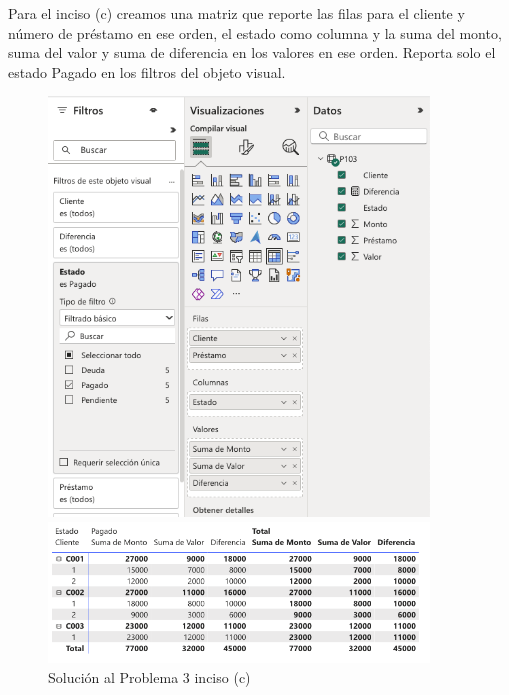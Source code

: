 \documentclass{article}
\begin{document}
\break
\noindent
Para el inciso (c) creamos una matriz que reporte las filas para el cliente y número de préstamo en ese orden, el estado como columna y la suma del monto, suma del valor y suma de diferencia en los valores en ese orden. Reporta solo el estado Pagado en los filtros del objeto visual.
\begin{figure}[!h]
    \centering
    \begin{minipage}{\textwidth}
        \centering
        \includegraphics[width=0.9\textwidth]{figures/s103c-1.png}
    \end{minipage}
    \hfill
    \begin{minipage}{\textwidth}
        \centering
        \includegraphics[width=0.9\textwidth]{figures/s103c-2.png}
    \end{minipage}
    \captionsetup{width=0.9\textwidth}
    \caption{Solución al Problema 3 inciso (c)}
    \label{fig:s103c}
\end{figure}
\end{document}
